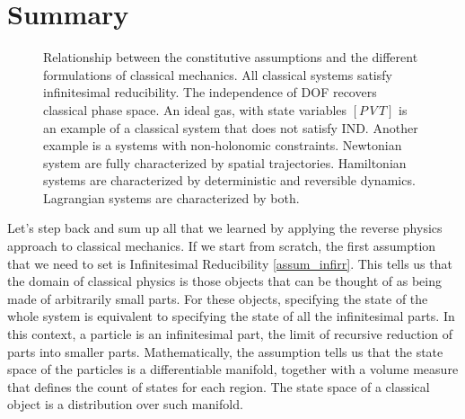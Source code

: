 \section{Summary}
\begin{figure}
	\centering
	\caption {Relationship between the constitutive assumptions and the different formulations of classical mechanics. All classical systems satisfy infinitesimal reducibility. The independence of DOF recovers classical phase space. An ideal gas, with state variables $[P \, V \, T]$ is an example of a classical system that does not satisfy IND. Another example is a systems with non-holonomic constraints. Newtonian system are fully characterized by spatial trajectories. Hamiltonian systems are characterized by deterministic and reversible dynamics. Lagrangian systems are characterized by both.}
\end{figure}
Let's step back and sum up all that we learned by applying the reverse physics approach to classical mechanics. If we start from scratch, the first assumption that we need to set is Infinitesimal Reducibility \ref{assum_infirr}. This tells us that the domain of classical physics is those objects that can be thought of as being made of arbitrarily small parts. For these objects, specifying the state of the whole system is equivalent to specifying the state of all the infinitesimal parts. In this context, a particle is an infinitesimal part, the limit of recursive reduction of parts into smaller parts. Mathematically, the assumption tells us that the state space of the particles is a differentiable manifold, together with a volume measure that defines the count of states for each region. The state space of a classical object is a distribution over such manifold.

